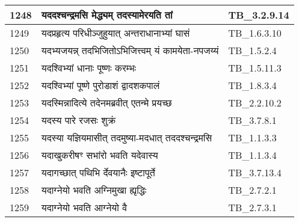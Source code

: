 \documentclass[17pt]{extarticle}
\begin{document}
\begin{longtable}{||p{0.4in}||p{4.9in}||p{0.9in}||}
    \hline
        
    1248 & यददश्चन्द्रमसि मेद्ध्यम् तदस्यामेरयति तां & TB\_3.2.9.14       \\
    
    \hline
        
    1249 & यदप्रहृत्य परिधीञ्जुहुयात् अन्तराधानाभ्यां घासं & TB\_1.6.3.10       \\
    
    \hline
        
    1250 & यदभ्यजयन्न् तदभिजितोऽभिजित्त्वम् यं कामयेता{-}नपजय्यं & TB\_1.5.2.4       \\
    
    \hline
        
    1251 & यदश्विभ्यां धानाः पूष्णः करम्भः & TB\_1.5.11.3       \\
    
    \hline
        
    1252 & यदश्विभ्यां पूष्णे पुरोडाशं द्वादशकपालं & TB\_1.8.3.4       \\
    
    \hline
        
    1253 & यदस्मिन्नादित्ये तदेनमब्रवीत् एतन्मे प्रयच्छ & TB\_2.2.10.2       \\
    
    \hline
        
    1254 & यदस्य पारे रजसः शुक्रं & TB\_3.7.8.1       \\
    
    \hline
        
    1255 & यदस्या यज्ञियमासीत् तदमुष्या{-}मदधात् तददश्चन्द्रमसि & TB\_1.1.3.3       \\
    
    \hline
        
    1256 & यदाखुकरीषꣳ सभांरो भवति यदेवास्य & TB\_1.1.3.4       \\
    
    \hline
        
    1257 & यदागच्छात् पथिभि र्देवयानैः इष्टापूर्ते & TB\_3.7.13.4       \\
    
    \hline
        
    1258 & यदाग्नेयो भवति अग्निमुखा ह्यृद्धिः & TB\_2.7.2.1       \\
    
    \hline
        
    1259 & यदाग्नेयो भवति आग्नेयो वै & TB\_2.7.3.1       \\
    

\end{longtable}
\end{document}
